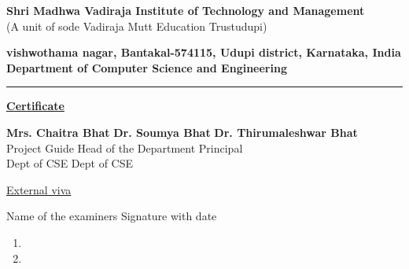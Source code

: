 \documentclass[12pt, a4paper]{report}
\begin{document}
\thispagestyle{empty}
\begin{mdframed}[linewidth=1pt]
\begin{center}
\textbf{Shri Madhwa Vadiraja Institute of Technology and Management}\\
\vspace{0.1cm}
{\small (A unit of sode Vadiraja Mutt Education Trust\textregistered udupi)}
\vspace{0.1cm}

\textbf{vishwothama nagar, Bantakal-574115, Udupi district, Karnataka, India}\\
\vspace{0.1cm}
\textbf{Department of Computer Science and Engineering}
\vspace{0.2cm}
\rule{15cm}{0.1mm}

\textbf{\large \underline{Certificate}}\\
\end{center}
\justify{\lipsum[1]}
\vspace{4cm}

\begin{tabbing}
\textbf{\footnotesize Mrs. Chaitra Bhat} \hspace{2cm}\=  
\textbf{\footnotesize Dr. Soumya Bhat} \hspace{2cm}\=
\textbf{\footnotesize Dr. Thirumaleshwar Bhat} \\

\footnotesize Project Guide \> Head of the Department \> Principal \\
\footnotesize Dept of CSE \> Dept of CSE\> \\

\end{tabbing}

\vspace{1cm}
\begin{center}
\underline{External viva}\\
\end{center}
\noindent Name of the examiners \hfill Signature with date\\
\begin{small}
\begin{enumerate}
\item
\item
\end{enumerate}
\end{small}

\end{mdframed}
\end{document}
